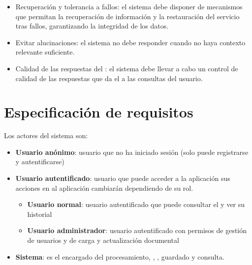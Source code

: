 \begin{itemize}
	\item {} Recuperación y tolerancia a fallos: el sistema debe disponer de mecanismos que permitan la recuperación de información y la restauración del servicio tras fallos, garantizando la integridad de los datos.
	\item {} Evitar alucinaciones: el sistema no debe responder cuando no haya contexto relevante suficiente.
	\item {} Calidad de las respuestas del : el sistema debe llevar a cabo un control de calidad de las respuestas que da el  a las consultas del usuario.
\end{itemize}

\section{Especificación de requisitos}

Los actores del sistema son:
\begin{itemize}
\tightlist
	\item \textbf{Usuario anónimo}: usuario que no ha iniciado sesión (solo puede registrarse y autentificarse)
	\item \textbf{Usuario autentificado}: usuario que puede acceder a la aplicación sus acciones en al aplicación cambiarán dependiendo de su rol. 
	\begin{itemize}
	\tightlist
	 	\item \textbf{Usuario normal}: usuario autentificado que puede consultar el  y ver su historial
	 	\item \textbf{Usuario administrador}: usuario autentificado con permisos de gestión de usuarios y de carga y actualización documental
	 \end{itemize}
	 \item \textbf{Sistema}: es el encargado del procesamiento, , , guardado y consulta. 
\end{itemize}

